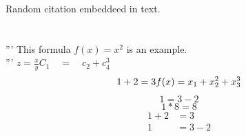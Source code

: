 \documentclass{article}
\begin{document}
    Random citation \cite{DUMMY:1} embeddeed in text.
    \section{}
    '''
    This formula $f(x) = x^2$ is an example.\\
    '''
    $z = \frac{x}{y}$\quad $C_1 \quad = \quad c_2 + c_4^3$\\
    \begin{equation*}
        1 + 2 = 3\\
        f(x) = x_1 + x_2^2 + x_3^3
    \end{equation*}
    \begin{equation*}
        1 = 3 - 2
    \end{equation*}
    \begin{equation*}
        1 * 8 = 8
    \end{equation*}
    \begin{align*}
        1 + 2 &= 3\\
        1 &= 3-2
    \end{align*}
\end{document}
